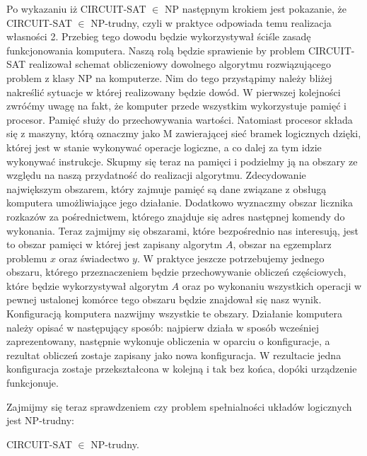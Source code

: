 Po wykazaniu iż CIRCUIT-SAT $\in$ NP następnym krokiem jest pokazanie, że CIRCUIT-SAT $\in$ NP-trudny, czyli w praktyce odpowiada temu realizacja własności 2. Przebieg tego dowodu będzie wykorzystywał ściśle zasadę funkcjonowania komputera. Naszą rolą będzie sprawienie by problem CIRCUIT-SAT realizował schemat obliczeniowy dowolnego algorytmu rozwiązującego problem z klasy NP na komputerze. Nim do tego przystąpimy należy bliżej nakreślić sytuacje w której realizowany będzie dowód. W pierwszej kolejności zwróćmy uwagę na fakt, że komputer przede wszystkim wykorzystuje pamięć i procesor.  Pamięć służy do przechowywania wartości. Natomiast procesor składa się z maszyny, którą oznaczmy jako M zawierającej sieć bramek logicznych dzięki, której jest w stanie  wykonywać operacje logiczne, a co dalej za tym idzie wykonywać instrukcje. Skupmy się teraz na pamięci i podzielmy ją na obszary ze względu na naszą przydatność do realizacji algorytmu. Zdecydowanie największym obszarem, który zajmuje pamięć są dane związane z obsługą komputera umożliwiające jego działanie. Dodatkowo wyznaczmy obszar licznika rozkazów za pośrednictwem, którego znajduje się adres następnej komendy do wykonania. Teraz zajmijmy się obszarami, które bezpośrednio nas interesują, jest to obszar pamięci w której jest zapisany algorytm $A$, obszar na egzemplarz problemu $x$ oraz świadectwo $y$. W praktyce  jeszcze potrzebujemy jednego obszaru, którego przeznaczeniem będzie przechowywanie obliczeń częściowych, które będzie wykorzystywał algorytm $A$ oraz po wykonaniu wszystkich operacji w pewnej ustalonej komórce tego obszaru będzie znajdował się nasz wynik. Konfiguracją komputera nazwijmy wszystkie te obszary. Działanie komputera należy opisać w następujący sposób: najpierw działa w sposób wcześniej zaprezentowany, następnie wykonuje obliczenia w oparciu o konfiguracje, a rezultat obliczeń zostaje zapisany jako nowa konfiguracja. W rezultacie jedna konfiguracja zostaje przekształcona w kolejną i tak bez końca, dopóki urządzenie funkcjonuje.


\newpage
Zajmijmy się teraz sprawdzeniem czy problem spełnialności układów logicznych jest NP-trudny:

\begin{lem}
	CIRCUIT-SAT $\in$ NP-trudny.
\end{lem}

